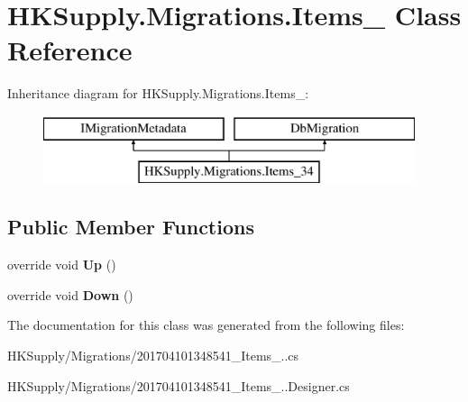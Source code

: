 \hypertarget{class_h_k_supply_1_1_migrations_1_1_items__34}{}\section{H\+K\+Supply.\+Migrations.\+Items\+\_ Class Reference}
\label{class_h_k_supply_1_1_migrations_1_1_items__34}
Inheritance diagram for H\+K\+Supply.\+Migrations.\+Items\+\_\+:\begin{figure}[H]
\begin{center}
\leavevmode
\includegraphics[height=2.000000cm]{class_h_k_supply_1_1_migrations_1_1_items__34}
\end{center}
\end{figure}
\subsection*{Public Member Functions}
\begin{DoxyCompactItemize}
\item 
\mbox{\label{class_h_k_supply_1_1_migrations_1_1_items__34_a386cd204473c14c6dad3d9184d348322}} 
override void {\bfseries Up} ()
\item 
\mbox{\label{class_h_k_supply_1_1_migrations_1_1_items__34_a42b72532a82b9c8fad4b422a93c7eb29}} 
override void {\bfseries Down} ()
\end{DoxyCompactItemize}


The documentation for this class was generated from the following files\+:\begin{DoxyCompactItemize}
\item 
H\+K\+Supply/\+Migrations/201704101348541\+\_\+\+Items\+\_..\+cs\item 
H\+K\+Supply/\+Migrations/201704101348541\+\_\+\+Items\+\_..\+Designer.\+cs\end{DoxyCompactItemize}

